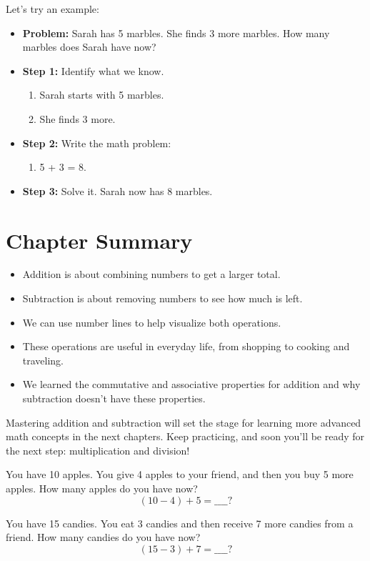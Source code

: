 Let’s try an example:
\begin{itemize}
    \item \textbf{Problem:} Sarah has 5 marbles. She finds 3 more marbles. How many marbles does Sarah have now?
    \item \textbf{Step 1:} Identify what we know.
    \begin{enumerate}
        \item Sarah starts with 5 marbles.
        \item She finds 3 more.
    \end{enumerate}
    \item \textbf{Step 2:} Write the math problem:
    \begin{enumerate}
        \item 5 + 3 = 8.
    \end{enumerate}
    \item \textbf{Step 3:} Solve it. Sarah now has 8 marbles.
\end{itemize}

\section{Chapter Summary}
\begin{itemize}
    \item Addition is about combining numbers to get a larger total.
    \item Subtraction is about removing numbers to see how much is left.
    \item We can use number lines to help visualize both operations.
    \item These operations are useful in everyday life, from shopping to cooking and traveling.
    \item We learned the commutative and associative properties for addition and why subtraction doesn’t have these properties.
\end{itemize}

Mastering addition and subtraction will set the stage for learning more advanced math concepts in the next chapters. Keep practicing, and soon you’ll be ready for the next step: multiplication and division!

You have 10 apples. You give 4 apples to your friend, and then you buy 5 more apples. How many apples do you have now?
\begin{equation*}
(10 - 4) + 5 = \_\_\_\_?
\end{equation*}

You have 15 candies. You eat 3 candies and then receive 7 more candies from a friend. How many candies do you have now?
\begin{equation*}
(15 - 3) + 7 = \_\_\_\_?
\end{equation*}

